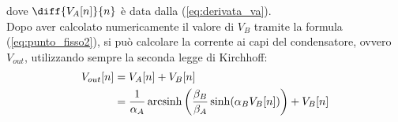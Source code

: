 		\noindent dove $\diff{V_{A}[n]}{n}$ è data dalla (\ref{eq:derivata_va}).\\
		
		Dopo aver calcolato numericamente il valore di $V_{B}$ tramite la formula (\ref{eq:punto_fisso2}), si può calcolare la corrente ai capi del condensatore, ovvero $V_{out}$, utilizzando sempre la seconda legge di Kirchhoff:
		\begin{equation}
			\label{eq:tensione_finale}
			\begin{split}
				V_{out}[n] &= V_{A}[n]+V_{B}[n]\\
				&= \frac{1}{\alpha_{A}} \operatorname{arcsinh} \left(\frac{\beta_{B}}{\beta_{A}} \sinh(\alpha_{B}V_{B}[n])\right)+V_{B}[n]
			\end{split}
		\end{equation}
